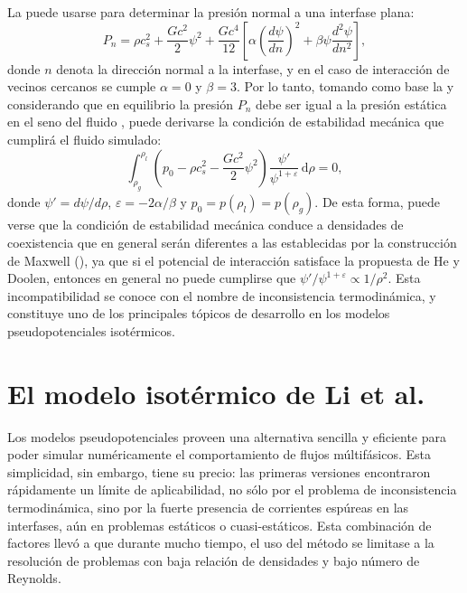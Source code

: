 La  puede usarse para determinar la presi\'on normal a una interfase plana:
\begin{equation}
	P_n = \rho c_s^2 + \dfrac{G c^2}{2} \psi^2 + \dfrac{G c^4}{12} \left[ \alpha \left( \dfrac{d\psi}{dn} \right)^2 + \beta \psi \dfrac{d^2 \psi}{dn^2} \right],
	\label{eq:ptens_shan_plane}	
\end{equation}
donde $n$ denota la direcci\'on normal a la interfase, y en el caso de interacci\'on de vecinos cercanos se cumple $\alpha = 0$ y $\beta = 3$. Por lo tanto, tomando como base la  y considerando que en equilibrio la presi\'on $P_n$ debe ser igual a la presi\'on est\'atica en el seno del fluido \cite{shan_pressure_2008}, puede derivarse la condici\'on de estabilidad mec\'anica que cumplir\'a el fluido simulado:
\begin{equation}
	\int_{\rho_g}^{\rho_l} \left( p_0 - \rho c_s^2 - \dfrac{Gc^2}{2} \psi^2 \right) \dfrac{\psi'}{\psi^{1+\varepsilon}} \, \mbox{d}\rho = 0,
\end{equation}
donde $\psi' = d\psi / d\rho$, $\varepsilon=-2\alpha/\beta$ y $p_0=p(\rho_l)=p(\rho_g)$. De esta forma, puede verse que la condici\'on de estabilidad mec\'anica conduce a densidades de coexistencia que en general ser\'an diferentes a las establecidas por la construcci\'on de Maxwell (), ya que si el potencial de interacci\'on satisface la propuesta de He y Doolen, entonces en general no puede cumplirse que $\psi' / \psi^{1+\varepsilon} \propto 1/\rho^2$. Esta incompatibilidad se conoce con el nombre de inconsistencia termodin\'amica, y constituye uno de los principales t\'opicos de desarrollo en los modelos pseudopotenciales isot\'ermicos.



\subsection{}






\section{El modelo isot\'ermico de Li et al.}

Los modelos pseudopotenciales proveen una alternativa sencilla y eficiente para poder simular num\'ericamente el comportamiento de flujos m\'ultif\'asicos. Esta simplicidad, sin embargo, tiene su precio: las primeras versiones encontraron r\'apidamente un l\'imite de aplicabilidad, no s\'olo por el problema de inconsistencia termodin\'amica, sino por la fuerte presencia de corrientes esp\'ureas en las interfases, a\'un en problemas est\'aticos o cuasi-est\'aticos. Esta combinaci\'on de factores llev\'o a que durante mucho tiempo, el uso del m\'etodo \pp{} se limitase a la resoluci\'on de problemas con baja relaci\'on de densidades y bajo n\'umero de Reynolds.

